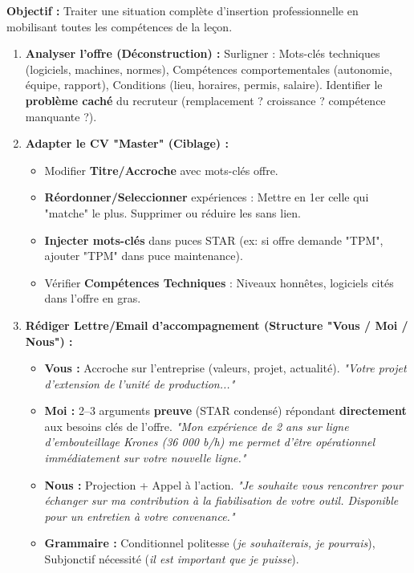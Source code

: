 \documentclass[11pt]{article}
\newcommand{\cle}[1]{{\popxbold\color{popdark}#1}}
\begin{document}
\begin{methode}
\textbf{Objectif :} Traiter une situation complète d'insertion professionnelle en mobilisant toutes les compétences de la leçon.
\begin{enumerate}
    \item \textbf{Analyser l'offre (Déconstruction) :} Surligner : \cle{Mots-clés techniques} (logiciels, machines, normes), \cle{Compétences comportementales} (autonomie, équipe, rapport), \cle{Conditions} (lieu, horaires, permis, salaire). Identifier le \textbf{problème caché} du recruteur (remplacement ? croissance ? compétence manquante ?).
    \item \textbf{Adapter le CV "Master" (Ciblage) :}
    \begin{itemize}
        \item Modifier \textbf{Titre/Accroche} avec mots-clés offre.
        \item \textbf{Réordonner/Seleccionner} expériences : Mettre en 1er celle qui "matche" le plus. Supprimer ou réduire les sans lien.
        \item \textbf{Injecter mots-clés} dans puces STAR (ex: si offre demande "TPM", ajouter "TPM" dans puce maintenance).
        \item Vérifier \textbf{Compétences Techniques} : Niveaux honnêtes, logiciels cités dans l'offre en gras.
    \end{itemize}
    \item \textbf{Rédiger Lettre/Email d'accompagnement (Structure "Vous / Moi / Nous") :}
    \begin{itemize}
        \item \textbf{Vous :} Accroche sur l'entreprise (valeurs, projet, actualité). \emph{"Votre projet d'extension de l'unité de production..."}
        \item \textbf{Moi :} 2--3 arguments \textbf{preuve} (STAR condensé) répondant \textbf{directement} aux besoins clés de l'offre. \emph{"Mon expérience de 2 ans sur ligne d'embouteillage Krones (36 000 b/h) me permet d'être opérationnel immédiatement sur votre nouvelle ligne."}
        \item \textbf{Nous :} Projection + Appel à l'action. \emph{"Je souhaite vous rencontrer pour échanger sur ma contribution à la fiabilisation de votre outil. Disponible pour un entretien à votre convenance."}
        \item \textbf{Grammaire :} Conditionnel politesse (\emph{je souhaiterais, je pourrais}), Subjonctif nécessité (\emph{il est important que je puisse}).

\end{itemize}
\end{enumerate}
\end{methode}
\end{document}
